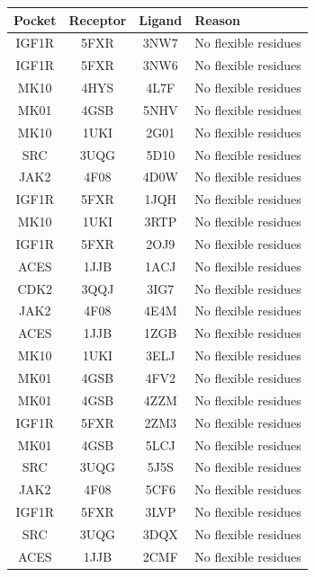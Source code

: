 \documentclass[journal=jcisd8,manuscript=article]{achemso}
\begin{document}
\begin{table}[]
    \centering
    \begin{tabular}{c c c l}
\toprule
Pocket & Receptor & Ligand & Reason \\
\midrule
IGF1R & 5FXR & 3NW7 & No flexible residues \\
IGF1R & 5FXR & 3NW6 & No flexible residues \\
MK10 & 4HYS & 4L7F & No flexible residues \\
MK01 & 4GSB & 5NHV & No flexible residues \\
MK10 & 1UKI & 2G01 & No flexible residues \\
SRC & 3UQG & 5D10 & No flexible residues \\
JAK2 & 4F08 & 4D0W & No flexible residues \\
IGF1R & 5FXR & 1JQH & No flexible residues \\
MK10 & 1UKI & 3RTP & No flexible residues \\
IGF1R & 5FXR & 2OJ9 & No flexible residues \\
ACES & 1JJB & 1ACJ & No flexible residues \\
CDK2 & 3QQJ & 3IG7 & No flexible residues \\
JAK2 & 4F08 & 4E4M & No flexible residues \\
ACES & 1JJB & 1ZGB & No flexible residues \\
MK10 & 1UKI & 3ELJ & No flexible residues \\
MK01 & 4GSB & 4FV2 & No flexible residues \\
MK01 & 4GSB & 4ZZM & No flexible residues \\
IGF1R & 5FXR & 2ZM3 & No flexible residues \\
MK01 & 4GSB & 5LCJ & No flexible residues \\
SRC & 3UQG & 5J5S & No flexible residues \\
JAK2 & 4F08 & 5CF6 & No flexible residues \\
IGF1R & 5FXR & 3LVP & No flexible residues \\
SRC & 3UQG & 3DQX & No flexible residues \\
ACES & 1JJB & 2CMF & No flexible residues \\


\end{tabular}
\end{table}
\end{document}
